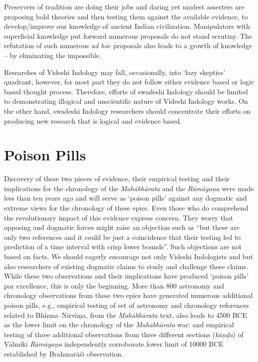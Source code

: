 Preservers of tradition are doing their jobs and daring yet modest asserters are proposing bold theories and then testing them against the available evidence, to develop/improve our knowledge of ancient Indian civilization. Manipulators with superficial knowledge put forward numerous proposals do not stand scrutiny. The refutation of such numerous \textit{ad hoc} proposals also leads to a growth of knowledge – by eliminating the impossible.

Researches of Videshi Indology may fall, occasionally, into ‘lazy skeptics’ quadrant, however, for most part they do not follow either evidence based or logic based thought process. Therefore, efforts of swadeshi Indology should be limited to demonstrating illogical and unscientific nature of Videshi Indology works. On the other hand, swadeshi Indology researchers should concentrate their efforts on producing new research that is logical and evidence based.


\section*{Poison Pills}

Discovery of these two pieces of evidence, their empirical testing and their implications for the chronology of the \textit{Mahābhārata} and the \textit{Rāmāyaṇa} were made less than ten years ago and will serve as ‘poison pills’ against any dogmatic and extreme views for the chronology of these epics. Even those who do comprehend the revolutionary impact of this evidence express concern. They worry that opposing and dogmatic forces might raise an objection such as “but these are only two references and it could be just a coincidence that their testing led to prediction of a time interval with crisp lower bounds”. Such objections are not based on facts. We should eagerly encourage not only Videshi Indologists and but also researchers of existing dogmatic claims to study and challenge these claims. While these two observations and their implications have produced ‘poison pills’ par excellence, this is only the beginning. More than 800 astronomy and chronology observations from these two epics have generated numerous additional poison pills, e.g., empirical testing of set of astronomy and chronology references related to Bhīṣma–Nirvāṇa, from the \textit{Mahābhārata} text, also leads to 4500 BCE as the lower limit on the chronology of the \textit{Mahābhārata} war; and empirical testing of three additional observations from three different sections (\textit{kāṇḍa}) of Vālmīki \textit{Rāmāyaṇa} independently corroborate lower limit of 10000 BCE established by Brahmarāśi observation.

